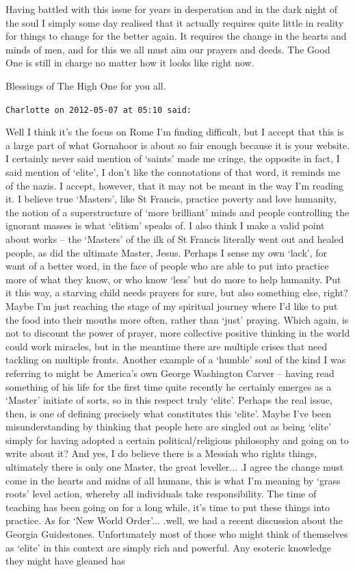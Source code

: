 \begin{footnotesize}
\begin{sffamily}
Having battled with this issue for years in desperation and in the dark night of the soul I simply some day realised that it actually requires quite little in reality for things to change for the better again. It requires the change in the hearts and minds of men, and for this we all must aim our prayers and deeds. The Good One is still in charge no matter how it looks like right now.

Blessings of The High One for you all.

\hfill

\texttt{Charlotte on 2012-05-07 at 05:10 said:}

Well I think it's the focus on Rome I'm finding difficult, but I accept that this is a large part of what Gornahoor is about so fair enough because it is your website. I certainly never said mention of `saints' made me cringe, the opposite in fact, I said mention of `elite', I don't like the connotations of that word, it reminds me of the nazis. I accept, however, that it may not be meant in the way I'm reading it. I believe true `Masters', like St Francis, practice poverty and love humanity, the notion of a superstructure of `more brilliant' minds and people controlling the ignorant masses is what `elitism' speaks of. I also think I make a valid point about works -- the `Masters' of the ilk of St Francis literally went out and healed people, as did the ultimate Master, Jesus. Perhaps I sense my own `lack', for want of a better word, in the face of people who are able to put into practice more of what they know, or who know `less' but do more to help humanity. Put it this way, a starving child needs prayers for sure, but also something else, right? Maybe I'm just reaching the stage of my spiritual journey where I'd like to put the food into their mouths more often, rather than `just' praying. Which again, is not to discount the power of prayer, more collective positive thinking in the world could work miracles, but in the meantime there are multiple crises that need tackling on multiple fronts. Another example of a `humble' soul of the kind I was referring to might be America's own George Washington Carver -- having read something of his life for the first time quite recently he certainly emerges as a `Master' initiate of sorts, so in this respect truly `elite'. Perhaps the real issue, then, is one of defining precisely what constitutes this `elite'. Maybe I've been misunderstanding by thinking that people here are singled out as being `elite' simply for having adopted a certain political/religious philosophy and going on to write about it? And yes, I do believe there is a Messiah who rights things, ultimately there is only one Master, the great leveller... .I agree the change must come in the hearts and midns of all humans, this is what I'm meaning by `grass roots' level action, whereby all individuals take responsibility. The time of teaching has been going on for a long while, it's time to put these things into practice. As for `New World Order'... .well, we had a recent discussion about the Georgia Guidestones. Unfortunately most of those who might think of themselves as `elite' in this context are simply rich and powerful. Any esoteric knowledge they might have gleaned has 
\end{sffamily}
\end{footnotesize}
